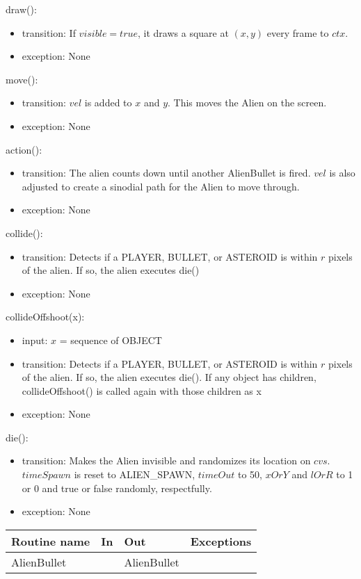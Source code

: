 \documentclass[12pt]{article}
\begin{document}
draw():
\begin{itemize}
  \item transition: If $visible = true$, it draws a square at $(x,y)$ every frame to $ctx$.
  \item exception: None
\end{itemize}

move():
\begin{itemize}
  \item transition: $vel$ is added to $x$ and $y$. This moves the Alien on the screen.
  \item exception: None
\end{itemize}

action():
\begin{itemize}
  \item transition: The alien counts down until another AlienBullet is fired. $vel$ is also adjusted to create a sinodial path for the Alien to move through.
  \item exception: None
\end{itemize}

collide():
\begin{itemize}
  \item transition: Detects if a PLAYER, BULLET, or ASTEROID is within $r$ pixels of the alien. If so, the alien executes die()
  \item exception: None
\end{itemize}

collideOffshoot(x):
\begin{itemize}
  \item input: $x$ = sequence of OBJECT
  \item transition: Detects if a PLAYER, BULLET, or ASTEROID is within $r$ pixels of the alien. If so, the alien executes die(). If any object has children, collideOffshoot() is called again with those children as x
  \item exception: None
\end{itemize}

die():
\begin{itemize}
  \item transition: Makes the Alien invisible and randomizes its location on $cvs$. $timeSpawn$ is reset to ALIEN\_SPAWN, $timeOut$ to 50, $xOrY$ and $lOrR$ to 1 or 0 and true or false randomly, respectfully.
  \item exception: None
\end{itemize}

\begin{tabular}{| l | l | l | l |}
    \hline
    \textbf{Routine name} & \textbf{In} & \textbf{Out} & \textbf{Exceptions}\\
    \hline
    AlienBullet & ~ & AlienBullet & ~\\
    \hline
\end{tabular}
\end{document}
